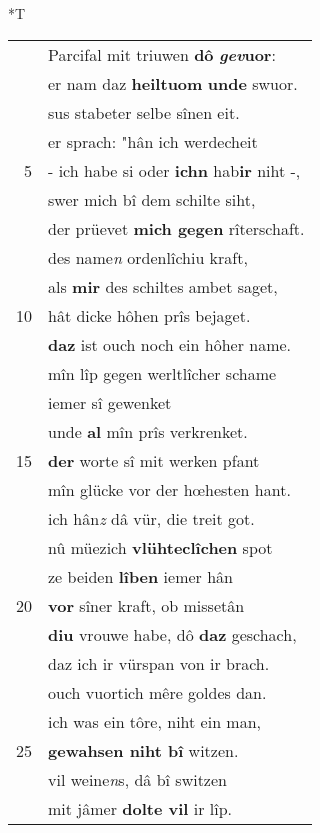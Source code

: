 \documentclass[8pt,a4paper,notitlepage]{article}
\begin{document}
\begin{table}[ht]
\begin{minipage}[t]{0.5\linewidth}
\end{minipage}
\hspace{0.5cm}
\begin{minipage}[t]{0.5\linewidth}
\small
\begin{center}*T
\end{center}
\begin{tabular}{rl}
 & Parcifal mit triuwen \textbf{dô} \textbf{\textit{gev}uor}:\\ 
 & er nam daz \textbf{heiltuom} \textbf{unde} swuor.\\ 
 & sus stabeter selbe sînen eit.\\ 
 & er sprach: "hân ich werdecheit\\ 
5 & - ich habe si oder \textbf{ich}\textbf{n} hab\textbf{ir} niht -,\\ 
 & swer mich bî dem schilte siht,\\ 
 & der prüevet \textbf{mich gegen} rîterschaft.\\ 
 & des name\textit{n} ordenlîchiu kraft,\\ 
 & als \textbf{mir} des schiltes ambet saget,\\ 
10 & hât dicke hôhen prîs bejaget.\\ 
 & \textbf{daz} ist ouch noch ein hôher name.\\ 
 & mîn lîp gegen werltlîcher schame\\ 
 & iemer sî gewenket\\ 
 & unde \textbf{al} mîn prîs verkrenket.\\ 
15 & \textbf{der} worte sî mit werken pfant\\ 
 & mîn glücke vor der hœhesten hant.\\ 
 & ich hân\textit{z} dâ vür, die treit got.\\ 
 & nû müezich \textbf{vlühteclîchen} spot\\ 
 & ze beiden \textbf{lîben} iemer hân\\ 
20 & \textbf{vor} sîner kraft, ob missetân\\ 
 & \textbf{diu} vrouwe habe, dô \textbf{daz} geschach,\\ 
 & daz ich ir vürspan von ir brach.\\ 
 & ouch vuortich mêre goldes dan.\\ 
 & ich was ein tôre, niht ein man,\\ 
25 & \textbf{gewahsen niht bî} witzen.\\ 
 & vil weine\textit{n}s, dâ bî switzen\\ 
 & mit jâmer \textbf{dolte vil} ir lîp.\\ 

\end{tabular}
\end{minipage}
\end{table}
\end{document}
